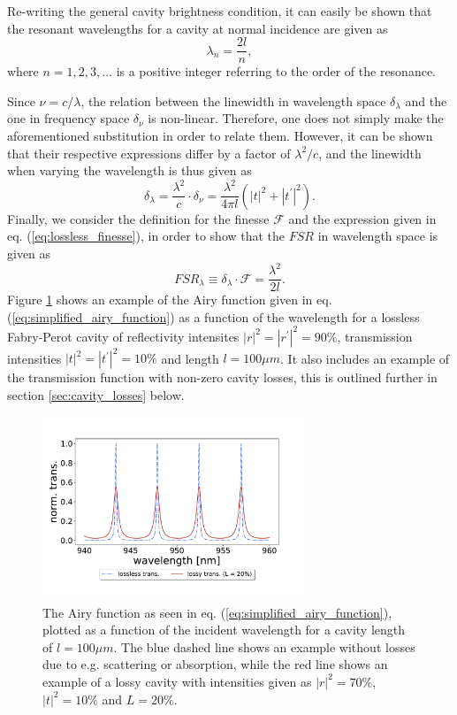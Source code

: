 Re-writing the general cavity brightness condition, it can easily be shown that the resonant wavelengths for a cavity at normal incidence are given as
\begin{equation}
    \lambda_n = \frac{2l}{n},
\end{equation}
where $n=1,2,3,...$ is a positive integer referring to the order of the resonance. 

Since $\nu = c / \lambda$, the relation between the linewidth in wavelength space $\delta_{\lambda}$ and the one in frequency space $\delta_{\nu}$ is non-linear. Therefore, one does not simply make the aforementioned substitution in order to relate them. However, it can be shown that their respective expressions differ by a factor of $\lambda^2/c$, and the linewidth when varying the wavelength is thus given as
\begin{equation}
    \delta_{\lambda} = \frac{\lambda^2}{c} \cdot \delta_{\nu} = \frac{\lambda^2}{4 \pi l} (|t|^2 + |t^{\prime}|^2).
\end{equation}
Finally, we consider the definition for the finesse $\mathcal{F}$ and the expression given in eq. (\ref{eq:lossless_finesse}), in order to show that the $FSR$ in wavelength space is given as 
\begin{equation}
    FSR_{\lambda} \equiv \delta_{\lambda} \cdot \mathcal{F} =  \frac{\lambda^2}{2l}.
\end{equation}
Figure \ref{fig:airy_trans_vs_wavelength} shows an example of the Airy function given in eq. (\ref{eq:simplified_airy_function}) as a function of the wavelength for a lossless Fabry-Perot cavity of reflectivity intensites $|r|^2 = |r^{\prime}|^2 = 90\%$, transmission intensities $|t|^2 = |t^{\prime}|^2 = 10\%$ and length $l=100 \mu m$. It also includes an example of the transmission function with non-zero cavity losses, this is outlined further in section \ref{sec:cavity_losses} below.

\begin{figure}[h!]
    \centering
    \includegraphics[width=0.7\textwidth]{figures/airy_function_vs_wavelength.pdf}
    \caption{The Airy function as seen in eq. (\ref{eq:simplified_airy_function}), plotted as a function of the incident wavelength for a cavity length of $l = 100 \mu m$. The blue dashed line shows an example without losses due to e.g. scattering or absorption, while the red line shows an example of a lossy cavity with intensities given as $|r|^2 = 70\%$, $|t|^2 = 10\%$ and $L = 20\%$.}
    \label{fig:airy_trans_vs_wavelength}
\end{figure}

